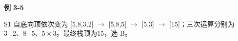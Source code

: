 {\color{ink}\bfseries 例 3-5}\par\vspace{1bp}S1 自底向顶依次变为 [5,\allowbreak{}8,\allowbreak{}3,\allowbreak{}2] \(\to \) [5,\allowbreak{}8,\allowbreak{}5] \(\to \) [5,\allowbreak{}3] \(\to \) [15]；三次运算分别为3+\allowbreak{}2、8\(-\)5、\(5\times 3\)。最终栈顶为15，选 B。
